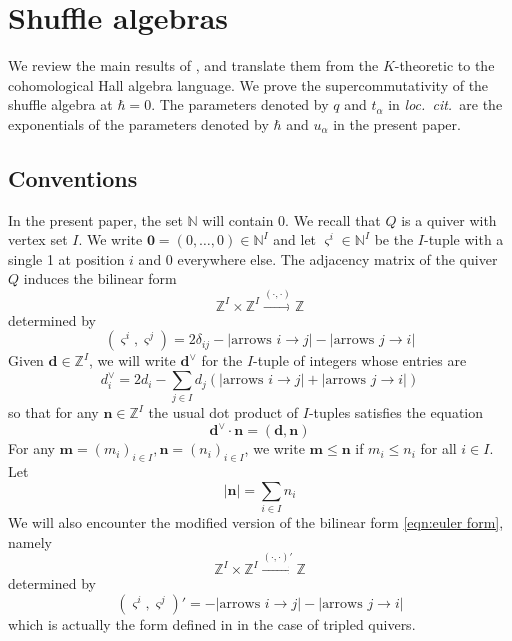 \documentclass{amsart}
\def\BN{{\mathbb{N}}}
\def\BZ{{\mathbb{Z}}}
\def\bd{{\mathbf{d}}}
\def\bs{\boldsymbol{\varsigma}}
\def\nn{{\mathbb{N}^I}}
\def\zz{{\mathbb{Z}^I}}
\def\bm{{\boldsymbol{m}}}
\def\bn{{\boldsymbol{n}}}
\def\b0{{\boldsymbol{0}}}
\def\loccit{\emph{loc.~cit.~}}
\begin{document}
\bigskip 

\section{Shuffle algebras}
\label{sec:shuffle}

\medskip 

\noindent We review the main results of \cite{JNCoulomb}, and translate them from the $K$-theoretic to the cohomological Hall algebra language. We prove the supercommutativity of the shuffle algebra at $\hbar = 0$. The parameters denoted by $q$ and $t_\alpha$ in \loccit are the exponentials of the parameters denoted by $\hbar$ and $u_\alpha$ in the present paper. 

\medskip

\subsection{Conventions}
\label{sub:conventions}

In the present paper, the set $\BN$ will contain 0. We recall that $Q$ is a quiver with vertex set $I$. We write $\b0 = (0,\dots,0) \in \nn$ and let $\bs^i \in \nn$ be the $I$-tuple with a single 1 at position $i$ and 0 everywhere else. The adjacency matrix of the quiver $Q$ induces the bilinear form
\begin{equation}
\label{eqn:euler form}
\zz \times \zz \xrightarrow{( \cdot, \cdot )} \BZ
\end{equation}
determined by
$$
( \bs^i, \bs^j ) = 2\delta_{ij} - \Big|\text{arrows }i \rightarrow j\Big| - \Big|\text{arrows }j \rightarrow i\Big|
$$
Given $\bd \in \zz$, we will write $\bd^\vee$ for the $I$-tuple of integers whose entries are
\begin{equation}
\label{eqn:vee}
d^\vee_i = 2d_i - \sum_{j \in I} d_j \left( \Big|\text{arrows }i \rightarrow j\Big| + \Big|\text{arrows }j \rightarrow i\Big| \right)
\end{equation}
so that for any $\bn \in \zz$ the usual dot product of $I$-tuples satisfies the equation
$$
\bd^\vee \cdot \bn = (\bd,\bn)
$$
For any $\bm = (m_i)_{i \in I}, \bn = (n_i)_{i \in I}$, we write $\bm \leq \bn$ if $m_i \leq n_i$ for all $i \in I$. Let
$$
|\bn| = \sum_{i \in I} n_i
$$
We will also encounter the modified version of the bilinear form \eqref{eqn:euler form}, namely
\begin{equation}
\label{eqn:modified euler form}
\zz \times \zz \xrightarrow{( \cdot, \cdot )'} \BZ
\end{equation}
determined by
$$
( \bs^i, \bs^j )' = - \Big|\text{arrows }i \rightarrow j\Big| - \Big|\text{arrows }j \rightarrow i\Big|
$$
which is actually the form defined in \cite{jindalnegutbps} in the case of tripled quivers.
\end{document}
